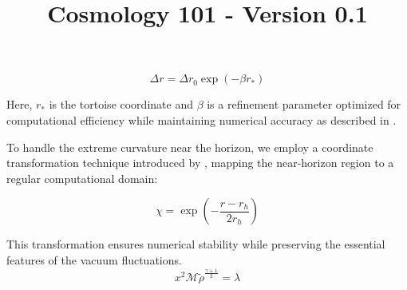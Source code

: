 \documentclass{article}\usepackage{graphicx} \usepackage{amsmath} \usepackage{colortbl}\title{Cosmology 101 - Version 0.1}
\begin{document}
\begin{equation}
\Delta r = \Delta r_0 \exp(-\beta r_*)
\end{equation}

Here, $r_*$ is the tortoise coordinate and $\beta$ is a refinement parameter optimized for computational efficiency while maintaining numerical accuracy as described in \cite{birrell1984}.

To handle the extreme curvature near the horizon, we employ a coordinate transformation technique introduced by \cite{hawking1975}, mapping the near-horizon region to a regular computational domain:

\begin{equation}
\chi = \exp\left(-\frac{r-r_h}{2r_h}\right)
\end{equation}

This transformation ensures numerical stability while preserving the essential features of the vacuum fluctuations. \begin{equation}x^2 \mathcal{M} \tilde{\rho }^{\frac{\gamma +1}{2}}=\lambda \label{Mi ecuacion 8} \end{equation}
\end{document}
